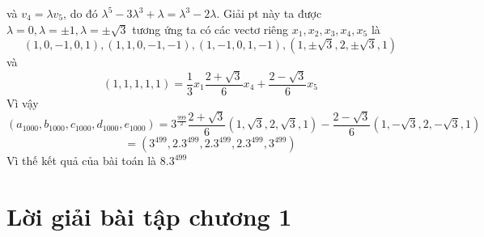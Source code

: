 \begin{baitap}
\begin{loigiai1}
\[\]
và $v_4  = \lambda v_5 $, do đó $\lambda ^5  - 3\lambda ^3  + \lambda  = \lambda ^3  - 2\lambda $. Giải pt này ta được $\lambda  = 0,\lambda  =  \pm 1,\lambda  =  \pm \sqrt 3 $ tương ứng ta có các vectơ riêng $x_1 ,x_2 ,x_3 ,x_4 ,x_5 $ là 
\[\left( {1,0, - 1,0,1} \right),\left( {1,1,0, - 1, - 1} \right),\left( {1, - 1,0,1, - 1} \right),\left( {1, \pm \sqrt 3 ,2, \pm \sqrt 3 ,1} \right)\]
và \[\left( {1,1,1,1,1} \right) = \frac{1}{3}x_1 \frac{{2 + \sqrt 3 }}{6}x_4  + \frac{{2 - \sqrt 3 }}{6}x_5 \]
Vì vậy \[\left( {a_{1000} ,b_{1000} ,c_{1000} ,d_{1000} ,e_{1000} } \right) = 3^{\frac{{999}}{2}} \frac{{2 + \sqrt 3 }}{6}\left( {1,\sqrt 3 ,2,\sqrt 3 ,1} \right) - \frac{{2 - \sqrt 3 }}{6}\left( {1, - \sqrt 3 ,2, - \sqrt 3 ,1} \right)\]
\[=\left( {3^{499} ,2.3^{499} ,2.3^{499} ,2.3^{499} ,3^{499} } \right)\]
Vì thế kết quả của bài toán là $8.3^{499} $
\end{loigiai1}
\end{baitap}

\section*{Lời giải bài tập chương 1}
{\small}
